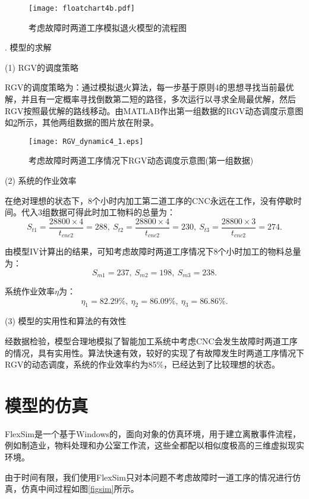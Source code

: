 \documentclass[no-math,withoutpreface,bwprint]{cumcmthesis} %
\numberwithin{equation}{section}
\numberwithin{figure}{section}
\numberwithin{table}{section}
\begin{document}
\begin{figure}[!htbp]
	\vspace{-1.5cm}
	\hspace{-0.5cm}
	\texttt{[image: floatchart4b.pdf]}
	\caption{考虑故障时两道工序模拟退火模型的流程图}
     \label{pro4}
\end{figure}

. 模型的求解

\noindent(1) RGV的调度策略

RGV的调度策略为：通过模拟退火算法，每一步基于原则4的思想寻找当前最优解，并且有一定概率寻找倒数第二短的路径，多次运行以寻求全局最优解，然后RGV按照最优解的路线移动。由MATLAB作出第一组数据的RGV动态调度示意图如\ref{figdy4}所示，其他两组数据的图片放在附录。

\begin{figure}[!htbp]
	\hspace{-0.5cm}
	\texttt{[image: RGV\_dynamic4\_1.eps]}
	\caption{考虑故障时两道工序情况下RGV动态调度示意图(第一组数据)}
     \label{figdy4}
\end{figure}

\noindent(2) 系统的作业效率

在绝对理想的状态下，8个小时内加工第二道工序的CNC永远在工作，没有停歇时间。代入3组数据可得此时加工物料的总量为：
$$S_{t1}=\dfrac{28800\times4}{t_{cnc2}}=288,
\ S_{t2}=\dfrac{28800\times4}{t_{cnc2}}=230,
\ S_{t3}=\dfrac{28800\times3}{t_{cnc2}}=274.$$

由模型IV计算出的结果，可知考虑故障时两道工序情况下8个小时加工的物料总量为：$$S_{m1}=237,\ S_{m2}=198,\ S_{m3}=238.$$

系统作业效率$\eta$为：
$$\eta_1=82.29\%,\ \eta_2=86.09\%,\ \eta_3=86.86\%.$$

\noindent(3) 模型的实用性和算法的有效性

经数据检验，模型合理地模拟了智能加工系统中考虑CNC会发生故障时两道工序的情况，具有实用性。算法快速有效，较好的实现了有故障发生时两道工序情况下RGV的动态调度，系统的作业效率约为85\%，已经达到了比较理想的状态。

\section{模型的仿真}

FlexSim是一个基于Windows的，面向对象的仿真环境，用于建立离散事件流程，例如制造业，物料处理和办公室工作流，这些全都配以相似度极高的三维虚拟现实环境。

由于时间有限，我们使用FlexSim只对本问题不考虑故障时一道工序的情况进行仿真，仿真中间过程如图\ref{figsim}所示。
\end{document}

